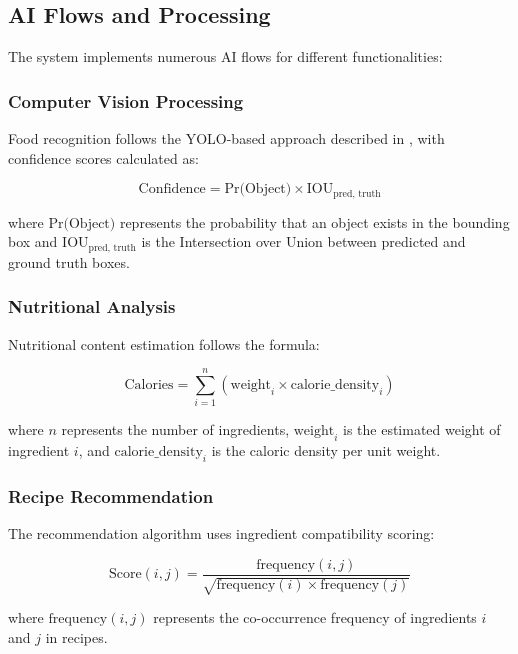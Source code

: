 \documentclass[conference]{IEEEtran}
\begin{document}
\subsection{AI Flows and Processing}
The system implements numerous AI flows for different functionalities:

\subsubsection{Computer Vision Processing}
Food recognition follows the YOLO-based approach described in \cite{ieee9526989}, with confidence scores calculated as:

\begin{equation}
\text{Confidence} = \text{Pr(Object)} \times \text{IOU}_{\text{pred, truth}}
\end{equation}

where $\text{Pr(Object)}$ represents the probability that an object exists in the bounding box and $\text{IOU}_{\text{pred, truth}}$ is the Intersection over Union between predicted and ground truth boxes.

\subsubsection{Nutritional Analysis}
Nutritional content estimation follows the formula:

\begin{equation}
\text{Calories} = \sum_{i=1}^{n} (\text{weight}_i \times \text{calorie\_density}_i)
\end{equation}

where $n$ represents the number of ingredients, $\text{weight}_i$ is the estimated weight of ingredient $i$, and $\text{calorie\_density}_i$ is the caloric density per unit weight.

\subsubsection{Recipe Recommendation}
The recommendation algorithm uses ingredient compatibility scoring:

\begin{equation}
\text{Score}(i,j) = \frac{\text{frequency}(i,j)}{\sqrt{\text{frequency}(i) \times \text{frequency}(j)}}
\end{equation}

where $\text{frequency}(i,j)$ represents the co-occurrence frequency of ingredients $i$ and $j$ in recipes.
\end{document}
